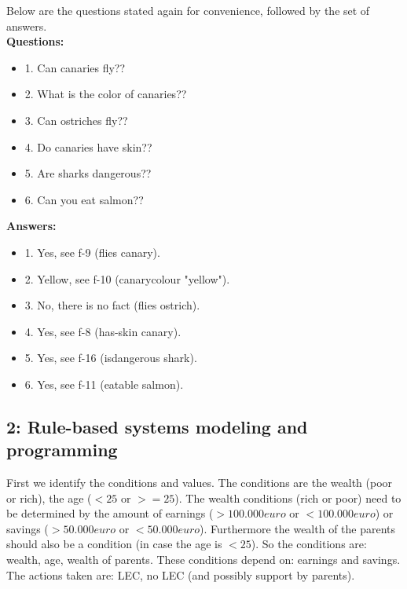 \documentclass[a4paper]{article}
\begin{document}
Below are the questions stated again for convenience, followed by the set of answers. \\ \textbf{Questions:}
\begin{itemize}
	\item 1. Can canaries fly??
	\item 2. What is the color of canaries??
	\item 3. Can ostriches fly??
	\item 4. Do canaries have skin??
	\item 5. Are sharks dangerous??
	\item 6. Can you eat salmon??
\end{itemize}
\textbf{Answers:}
\begin{itemize}
	\item 1. Yes, see f-9 (flies canary).
	\item 2. Yellow, see f-10 (canarycolour "yellow").
	\item 3. No, there is no fact (flies ostrich).
	\item 4. Yes, see f-8 (has-skin canary).
	\item 5. Yes, see f-16 (isdangerous shark).
	\item 6. Yes, see f-11 (eatable salmon).
\end{itemize}

\subsection*{2: Rule-based systems modeling and programming}
First we identify the conditions and values.  The conditions are the wealth (poor or rich), the age ($<25$ or $>=25$). The wealth conditions (rich or poor) need to be determined by the amount of earnings ($>100.000 euro$ or $<100.000 euro$) or savings ($>50.000 euro$ or $<50.000 euro$). Furthermore the wealth of the parents should also be a condition (in case the age is $<25$). So the conditions are: wealth, age, wealth of parents. These conditions depend on: earnings and savings. The actions taken are: LEC, no LEC (and possibly support by parents).  
\end{document}
